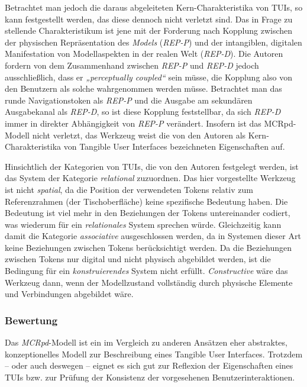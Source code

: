 Betrachtet man jedoch die daraus abgeleiteten Kern-Charakteristika von \glspl{TUI}, so kann festgestellt werden, das diese dennoch nicht verletzt sind. Das in Frage zu stellende Charakteristikum ist jene mit der Forderung nach Kopplung zwischen der physischen Repräsentation des \emph{Models} (\emph{REP-P}) und der intangiblen, digitalen Manifestation von Modellaspekten in der realen Welt (\emph{REP-D}). Die Autoren fordern von dem Zusammenhand zwischen \emph{REP-P} und \emph{REP-D} jedoch ausschließlich, dass er \emph{„perceptually coupled“} sein müsse, die Kopplung also von den Benutzern als solche wahrgenommen werden müsse. Betrachtet man das runde Navigationstoken als \emph{REP-P} und die Ausgabe am sekundären Ausgabekanal als \emph{REP-D}, so ist diese Kopplung feststellbar, da sich \emph{REP-D} immer in direkter Abhängigkeit von \emph{REP-P} verändert. Insofern ist das \gls{MCRpd}-Modell nicht verletzt, das Werkzeug weist die von den Autoren als Kern-Charakteristika von Tangible User Interfaces bezeichneten Eigenschaften auf.

Hinsichtlich der Kategorien von \glspl{TUI}, die von den Autoren festgelegt werden, ist das System der Kategorie \emph{relational} zuzuordnen. Das hier vorgestellte Werkzeug ist nicht \emph{spatial}, da die Position der verwendeten Tokens relativ zum Referenzrahmen (der Tischoberfläche) keine spezifische Bedeutung haben. Die Bedeutung ist viel mehr in den Beziehungen der Tokens untereinander codiert, was wiederum für ein \emph{relationales} System sprechen würde. Gleichzeitig kann damit die Kategorie \emph{associative} ausgeschlossen werden, da in Systemen dieser Art keine Beziehungen zwischen Tokens berücksichtigt werden. Da die Beziehungen zwischen Tokens nur digital und nicht physisch abgebildet werden, ist die Bedingung für ein \emph{konstruierendes} System nicht erfüllt. \emph{Constructive} wäre das Werkzeug dann, wenn der Modellzustand vollständig durch physische Elemente und Verbindungen abgebildet wäre.

\subsubsection{Bewertung}

Das \emph{MCRpd}-Modell ist ein im Vergleich zu anderen Ansätzen eher abstraktes, konzeptionelles Modell zur Beschreibung eines Tangible User Interfaces. Trotzdem -- oder auch deswegen -- eignet es sich gut zur Reflexion der Eigenschaften eines \glspl{TUI} bzw. zur Prüfung der Konsistenz der vorgesehenen Benutzerinteraktionen.

